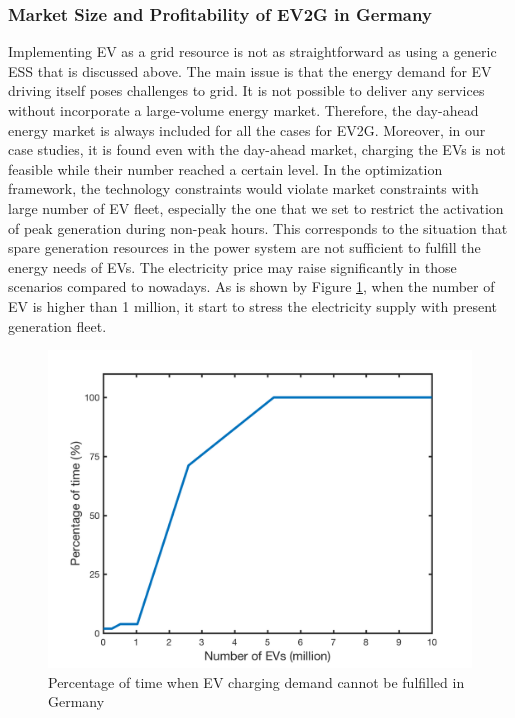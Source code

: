 \subsubsection{Market Size and Profitability of EV2G  in Germany}
Implementing EV as a grid resource is not as straightforward as using a generic ESS that is discussed above. The main issue is that the energy demand for EV driving itself poses challenges to grid. It is not possible to deliver any services without incorporate a large-volume energy market. Therefore, the day-ahead energy market is always included for all the cases for EV2G. Moreover, in our case studies, it is found even with the day-ahead market, charging the EVs is not feasible while their number reached a certain level. In the optimization framework, the technology constraints would violate market constraints with large number of EV fleet, especially the one that we set to restrict the activation of peak generation during non-peak hours. This corresponds to the situation that spare generation resources in the power system are not sufficient  to fulfill the energy needs of EVs. The electricity price may raise significantly in those scenarios compared to nowadays. As is shown by Figure \ref{fig:EV_nan_percentageg}, when the number of EV is higher than 1 million, it start to stress the electricity supply with present generation fleet. 
\begin{figure}[h!]
	\centering
	\includegraphics[width=0.95\linewidth]{Figures/EV_nan_percentage}
	\caption{Percentage of time when EV charging demand cannot be fulfilled in Germany}
	\label{fig:EV_nan_percentageg}
\end{figure}

